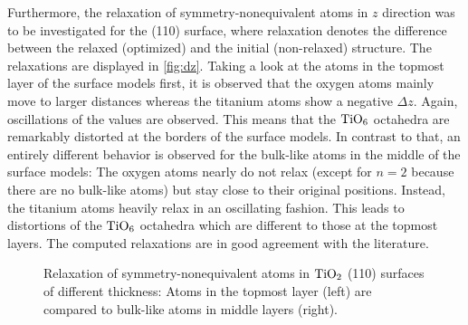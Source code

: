 \documentclass[a4paper,12pt]{scrartcl}
\begin{document}
Furthermore, the relaxation of symmetry-nonequivalent atoms in $ z $ direction was to be investigated for the (110) surface, where relaxation denotes the difference between the relaxed (optimized) and the initial (non-relaxed) structure. The relaxations are displayed in \autoref{fig:dz}. Taking a look at the atoms in the topmost layer of the surface models first, it is observed that the oxygen atoms mainly move to larger distances whereas the titanium atoms show a negative $ \Delta z $. Again, oscillations of the values are observed. This means that the $ \ce{TiO6} $ octahedra are remarkably distorted at the borders of the surface models. In contrast to that, an entirely different behavior is observed for the bulk-like atoms in the middle of the surface models: The oxygen atoms nearly do not relax (except for $n=2$ because there are no bulk-like atoms) but stay close to their original positions. Instead, the titanium atoms heavily relax in an oscillating fashion. This leads to distortions of the $ \ce{TiO6} $ octahedra which are different to those at the topmost layers. The computed relaxations are in good agreement with the literature.\autocite{rutile-surface-energy}
%
\begin{figure}[H]
	\centering
	
	\vspace{-20pt}
	\caption{Relaxation of symmetry-nonequivalent atoms in $ \ce{TiO2} $ (110) surfaces of different thickness: Atoms in the topmost layer (left) are compared to bulk-like atoms in middle layers (right).}
	\label{fig:dz}
\end{figure}
%
\end{document}

